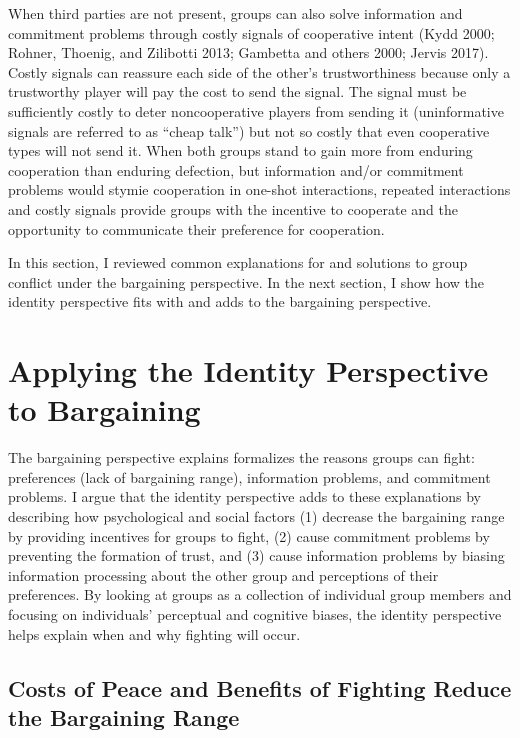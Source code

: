 \documentclass[11pt]{article}
\begin{document}
When third parties are not present, groups can also solve information
and commitment problems through costly signals of cooperative intent
(Kydd 2000; Rohner, Thoenig, and Zilibotti 2013; Gambetta and others
2000; Jervis 2017). Costly signals can reassure each side of the other's
trustworthiness because only a trustworthy player will pay the cost to
send the signal. The signal must be sufficiently costly to deter
noncooperative players from sending it (uninformative signals are
referred to as ``cheap talk'') but not so costly that even cooperative
types will not send it. When both groups stand to gain more from
enduring cooperation than enduring defection, but information and/or
commitment problems would stymie cooperation in one-shot interactions,
repeated interactions and costly signals provide groups with the
incentive to cooperate and the opportunity to communicate their
preference for cooperation.

In this section, I reviewed common explanations for and solutions to
group conflict under the bargaining perspective. In the next section, I
show how the identity perspective fits with and adds to the bargaining
perspective.

\hypertarget{applying-the-identity-perspective-to-bargaining}{%
\section{Applying the Identity Perspective to
Bargaining}\label{applying-the-identity-perspective-to-bargaining}}

The bargaining perspective explains formalizes the reasons groups can
fight: preferences (lack of bargaining range), information problems, and
commitment problems. I argue that the identity perspective adds to these
explanations by describing how psychological and social factors (1)
decrease the bargaining range by providing incentives for groups to
fight, (2) cause commitment problems by preventing the formation of
trust, and (3) cause information problems by biasing information
processing about the other group and perceptions of their preferences.
By looking at groups as a collection of individual group members and
focusing on individuals' perceptual and cognitive biases, the identity
perspective helps explain when and why fighting will occur.

\hypertarget{costs-of-peace-and-benefits-of-fighting-reduce-the-bargaining-range}{%
\subsection{Costs of Peace and Benefits of Fighting Reduce the
Bargaining
Range}\label{costs-of-peace-and-benefits-of-fighting-reduce-the-bargaining-range}}
\end{document}
